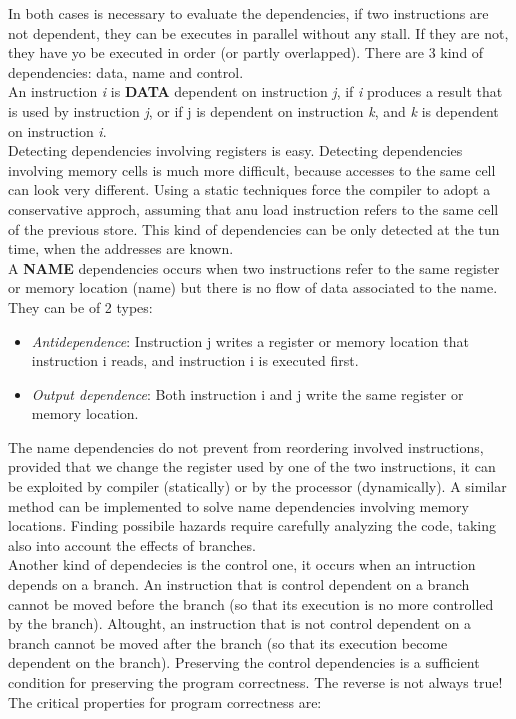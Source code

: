 \documentclass[12pt]{article}
\begin{document}
In both cases is necessary to evaluate the dependencies, if two instructions are not dependent, they can be executes in parallel without any stall. If they are not, they have yo be executed in order (or partly overlapped). There are 3 kind of dependencies: data, name and control.\\
An instruction \textit{i} is \textbf{DATA} dependent on instruction \textit{j}, if \textit{i} produces a result that is used by instruction \textit{j}, or if j is dependent on instruction \textit{k}, and \textit{k} is dependent on instruction \textit{i}.\\
Detecting dependencies involving registers is easy. Detecting dependencies involving memory cells is much more difficult, because accesses to the same cell can look very different. Using a static techniques force the compiler to adopt a conservative approch, assuming that anu load instruction refers to the same cell of the previous store. This kind of dependencies can be only detected at the tun time, when the addresses are known.\\
A \textbf{NAME} dependencies occurs when two instructions refer to the same register or memory location (name) but there is no flow of data associated to the name. They can be of 2 types:
\begin{itemize}
  \item \textit{Antidependence}: Instruction j writes a register or memory location that instruction i reads, and instruction i is executed first.
  \item \textit{Output dependence}: Both instruction i and j write the same register or memory location.
\end{itemize}
The name dependencies do not prevent from reordering involved instructions, provided that we change the register used by one of the two instructions, it can be exploited by compiler (statically) or by the processor (dynamically). A similar method can be implemented to solve name dependencies involving memory locations. Finding possibile hazards require carefully analyzing the code, taking also into account the effects of branches.\\
Another kind of dependecies is the control one, it occurs when an intruction depends on a branch. An instruction that is control dependent on a branch cannot be moved before the branch (so that its execution is no more controlled by the branch). Altought, an instruction that is not control dependent on a branch cannot be moved after the branch (so that its execution become dependent on the branch). Preserving the control dependencies is a sufficient condition for preserving the program correctness. The reverse is not always true! The critical properties for program correctness are:
\end{document}

